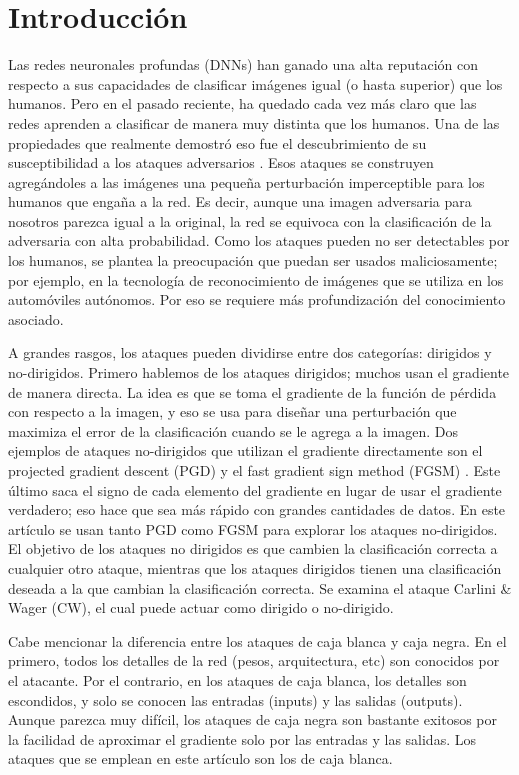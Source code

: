 \section{Introducción}

Las redes neuronales profundas (DNNs) han ganado una alta reputación con respecto a sus capacidades de clasificar imágenes igual (o hasta superior) que los humanos. Pero en el pasado reciente, ha quedado cada vez más claro que las redes aprenden a clasificar de manera muy distinta que los humanos. Una de las propiedades que realmente demostró eso fue el descubrimiento de su susceptibilidad a los ataques adversarios \cite{szegedy2014intriguing}. Esos ataques se construyen agregándoles a las imágenes una pequeña perturbación imperceptible para los humanos que engaña a la red. Es decir, aunque una imagen adversaria para nosotros parezca igual a la original, la red se equivoca con la clasificación de la adversaria con alta probabilidad. Como los ataques pueden no ser detectables por los humanos, se plantea la preocupación que puedan ser usados maliciosamente; por ejemplo, en la tecnología de reconocimiento de imágenes que se utiliza en los automóviles autónomos. Por eso se requiere más profundización del conocimiento asociado.

A grandes rasgos, los ataques pueden dividirse entre dos categorías: dirigidos y no-dirigidos. Primero hablemos de los ataques dirigidos; muchos usan el gradiente de manera directa. La idea es que se toma el gradiente de la función de pérdida con respecto a la imagen, y eso se usa para diseñar una perturbación que maximiza el error de la clasificación cuando se le agrega a la imagen. Dos ejemplos de ataques no-dirigidos que utilizan el gradiente directamente son el projected gradient descent (PGD) \cite{madry2019deep} y el fast gradient sign method (FGSM) \cite{goodfellow2015explaining}. Este último saca el signo de cada elemento del gradiente en lugar de usar el gradiente verdadero; eso hace que sea más rápido con grandes cantidades de datos. En este artículo se usan tanto PGD como FGSM para explorar los ataques no-dirigidos. El objetivo de los ataques no dirigidos es que cambien la clasificación correcta a cualquier otro ataque, mientras que los ataques dirigidos tienen una clasificación deseada a la que cambian la clasificación correcta. Se examina el ataque Carlini \& Wager (CW), el cual puede actuar como dirigido o no-dirigido. 

Cabe mencionar la diferencia entre los ataques de caja blanca y caja negra. En el primero, todos los detalles de la red (pesos, arquitectura, etc) son conocidos por el atacante. Por el contrario, en los ataques de caja blanca, los detalles son escondidos, y solo se conocen las entradas (inputs) y las salidas (outputs). Aunque parezca muy difícil, los ataques de caja negra son bastante exitosos por la facilidad de aproximar el gradiente solo por las entradas y las salidas. Los ataques que se emplean en este artículo son los de caja blanca.

